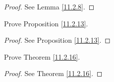\begin{proof}
    See Lemma \ref{11.2.8}.
\end{proof}

\begin{exercise}\label{ex 11.2.3}
    Prove Proposition \ref{11.2.13}.
\end{exercise}

\begin{proof}
    See Proposition \ref{11.2.13}.
\end{proof}

\begin{exercise}\label{ex 11.2.4}
    Prove Theorem \ref{11.2.16}.
\end{exercise}

\begin{proof}
    See Theorem \ref{11.2.16}.
\end{proof}